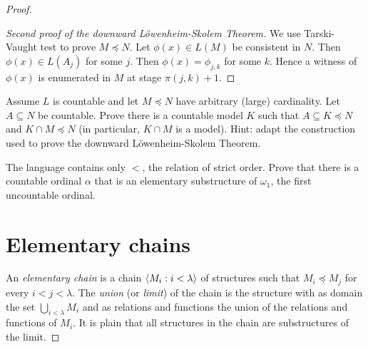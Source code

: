 \begin{proof}
\begin{proof}[Second proof of the downward L\"owenheim-Skolem Theorem]
  We use Tarski-Vaught test to prove $M\preceq N$.
  Let $\phi(x)\in L(M)$ be consistent in $N$.
  Then $\phi(x)\in L(A_j)$ for some $j$.
  Then $\phi(x)=\phi_{j,k}$ for some $k$.
  Hence a witness of $\phi(x)$ is enumerated in $M$ at stage $\pi(j,k)+1$.
\end{proof}


\begin{exercise}\label{ex_LS}
Assume $L$ is countable and let $M\preceq N$ have arbitrary (large) cardinality.
Let $A\subseteq N$ be countable.
Prove there is a countable model $K$ such that $A\subseteq K\preceq N$ and $K\cap M\preceq N$ (in particular, $K\cap M$ is a model).
Hint: adapt the construction used to prove the downward L\"owenheim-Skolem Theorem.
\end{exercise}

\begin{exercise}\label{ex_elem_sub_of_omega1}
  The language contains only $<$, the relation of strict order.
  Prove that there is a countable ordinal $\alpha$ that is an elementary substructure of $\omega_1$, the first uncountable ordinal.
\end{exercise}

\section{Elementary chains}

\def\ceq#1#2#3{%
\parbox{19ex}{\hfill$\displaystyle #1$}%
\parbox{5ex}{\hfil$#2$}%
\parbox[t]{15ex}{$\displaystyle #3$}}

An \emph{elementary chain\/} is a chain $\langle M_i:i<\lambda\rangle$ of structures such that $M_i\preceq M_j$ for every $i<j<\lambda$.
The \emph{union\/} (or \emph{limit\/}) of the chain is the structure with as domain the set $\bigcup_{i<\lambda}M_i$ and as relations and functions the union of the relations and functions of $M_i$.
It is plain that all structures in the chain are substructures of the limit.



\end{proof}
